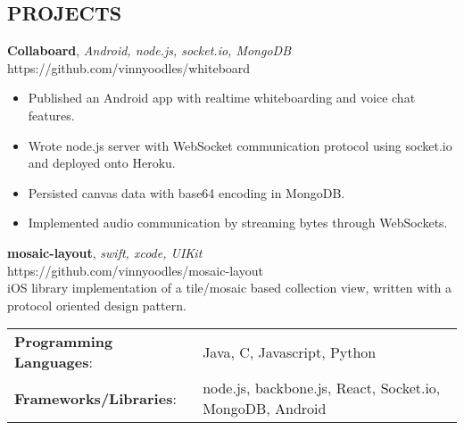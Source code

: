 \documentclass[line,margin]{res}
\begin{document}
\begin{resume}
	\section{PROJECTS}
	    \textbf{Collaboard}, {\sl Android, node.js, socket.io, MongoDB}\\ https://github.com/vinnyoodles/whiteboard\\
	    \begin{itemize} \itemsep 1pt
			\item Published an Android app with realtime whiteboarding and voice chat features.
			\item Wrote node.js server with WebSocket communication protocol using socket.io and deployed onto Heroku.
			\item Persisted canvas data with base64 encoding in MongoDB.
			\item Implemented audio communication by streaming bytes through WebSockets.
	    \end{itemize}
	    \textbf{mosaic-layout}, {\sl swift, xcode, UIKit}\\ 
	    https://github.com/vinnyoodles/mosaic-layout\\
	    iOS library implementation of a tile/mosaic based collection view, written with a protocol oriented design pattern.\\

	\begin{tabular}{@{}ll}
		\textbf{Programming Languages}: & Java, C, Javascript, Python   \\
		\textbf{Frameworks/Libraries}:  & node.js, backbone.js, React, Socket.io, MongoDB, Android \\
	\end{tabular}
\end{resume}
\end{document}
